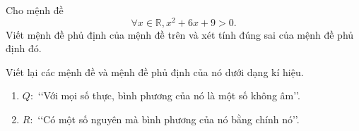 \begin{bt}[0,5 điểm]%
	Cho mệnh đề
	$$ \forall x \in \mathbb{R}, x^2 + 6x + 9 > 0. $$
	Viết mệnh đề phủ định của mệnh đề trên và xét tính đúng sai của mệnh đề phủ định đó.
\end{bt}

\begin{bt}[Mức độ 2]%
Viết lại các mệnh đề và mệnh đề phủ định của nó dưới dạng kí hiệu.
\begin{enumerate}
\item  $Q\colon $ \lq\lq Với mọi số thực, bình phương của nó là một số không âm\rq\rq.
\item $R\colon$ \lq\lq Có một số nguyên mà bình phương của nó bằng chính nó\rq\rq.
\end{enumerate}
\end{bt}


